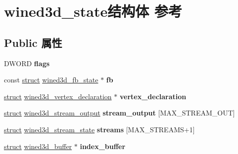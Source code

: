 \hypertarget{structwined3d__state}{}\section{wined3d\+\_\+state结构体 参考}
\label{structwined3d__state}
\subsection*{Public 属性}
\begin{DoxyCompactItemize}
\item 
\mbox{\label{structwined3d__state_ac4df4159729fb74528269a23316bb9c8}} 
D\+W\+O\+RD {\bfseries flags}
\item 
\mbox{\label{structwined3d__state_a19e6c6e6f993b99087c82040f2ce5805}} 
const \hyperlink{interfacestruct}{struct} \hyperlink{structwined3d__fb__state}{wined3d\+\_\+fb\+\_\+state} $\ast$ {\bfseries fb}
\item 
\mbox{\label{structwined3d__state_a0998e22738b8644cb586373e526e3764}} 
\hyperlink{interfacestruct}{struct} \hyperlink{structwined3d__vertex__declaration}{wined3d\+\_\+vertex\+\_\+declaration} $\ast$ {\bfseries vertex\+\_\+declaration}
\item 
\mbox{\label{structwined3d__state_a74cb5efa7c6732d9d1bb2d70c9e95aca}} 
\hyperlink{interfacestruct}{struct} \hyperlink{structwined3d__stream__output}{wined3d\+\_\+stream\+\_\+output} {\bfseries stream\+\_\+output} \mbox{[}M\+A\+X\+\_\+\+S\+T\+R\+E\+A\+M\+\_\+\+O\+UT\mbox{]}
\item 
\mbox{\label{structwined3d__state_aa77249b6c183b04f46325bbfdf49bc79}} 
\hyperlink{interfacestruct}{struct} \hyperlink{structwined3d__stream__state}{wined3d\+\_\+stream\+\_\+state} {\bfseries streams} \mbox{[}M\+A\+X\+\_\+\+S\+T\+R\+E\+A\+MS+1\mbox{]}
\item 
\mbox{\label{structwined3d__state_aa5c4ab1f9ab82241f596a53d6581f18d}} 
\hyperlink{interfacestruct}{struct} \hyperlink{structwined3d__buffer}{wined3d\+\_\+buffer} $\ast$ {\bfseries index\+\_\+buffer}
\item 
\mbox{\label{structwined3d__state_a047e521b3a467bd092cf8b511e2dc807}} 

\end{DoxyCompactItemize}
